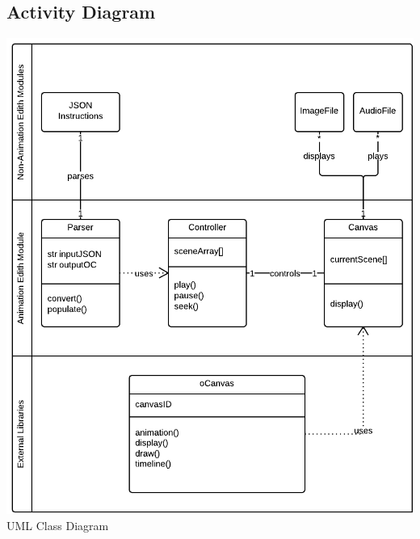 \documentclass[12pt]{article}
\begin{document}
\subsection{Activity Diagram}
\includegraphics[scale=.45]{AnimationUMLClassDiagram.png}
\\UML Class Diagram
\pagebreak

\end{document}
